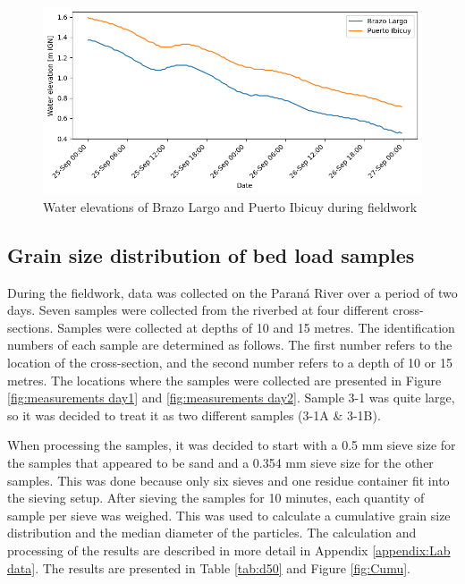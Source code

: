 \begin{figure}[H]
    \centering
    \includegraphics[width=0.75\linewidth]{figures/ch6/water elevations fieldwork.png}
    \caption{Water elevations of Brazo Largo and Puerto Ibicuy during fieldwork}
    \label{fig:water elevations fieldwork}
\end{figure}


\subsection{Grain size distribution of bed load samples}
\label{sec:grainsizedistribution}
During the fieldwork, data was collected on the Paraná River over a period of two days. Seven samples were collected from the riverbed at four different cross-sections. Samples were collected at depths of 10 and 15 metres. The identification numbers of each sample are determined as follows. The first number refers to the location of the cross-section, and the second number refers to a depth of 10 or 15 metres. The locations where the samples were collected are presented in Figure \ref{fig:measurements day1} and \ref{fig:measurements day2}. Sample 3-1 was quite large, so it was decided to treat it as two different samples (3-1A \& 3-1B). 

When processing the samples, it was decided to start with a 0.5 mm sieve size for the samples that appeared to be sand and a 0.354 mm sieve size for the other samples. This was done because only six sieves and one residue container fit into the sieving setup. After sieving the samples for 10 minutes, each quantity of sample per sieve was weighed. This was used to calculate a cumulative grain size distribution and the median diameter of the particles. The calculation and processing of the results are  described in more detail in Appendix \ref{appendix:Lab data}. The results are presented in Table \ref{tab:d50} and Figure \ref{fig:Cumu}.

